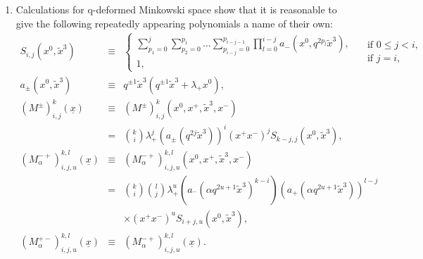 \documentclass[a4paper,11pt,oneside]{article}
\newcommand{\text}[1]{\mbox{#1}}
\begin{document}
\begin{enumerate}
\item  Calculations for q-deformed Minkowski space show that it is
reasonable to give the following repeatedly appearing polynomials a name of
their own: 
\begin{eqnarray}
S_{i,j}\left( x^{0},\tilde{x}^{3}\right) &\equiv &\left\{ 
\begin{array}{c}
\sum\limits_{p_{1}=0}^{j}\sum\limits_{p_{2}=0}^{p_{1}}\ldots
\sum\limits_{p_{i-j}=0}^{p_{i-j-1}}\prod\limits_{l=0}^{i-j}a_{-}\left(
x^{0},q^{2p_{l}}\tilde{x}^{3}\right) ,\quad \\ 
1,\quad
\end{array}
\right. \left. 
\begin{array}{l}
\text{if }0\leq j<i, \\ 
\text{if }j=i,
\end{array}
\right.  \nonumber \\
a_{\pm }\left( x^{0},\tilde{x}^{3}\right) &\equiv &q^{\pm 1}\tilde{x}%
^{3}\left( q^{\pm 1}\tilde{x}^{3}+\lambda _{+}x^{0}\right) , \\
\left( M^{\pm }\right) _{i,j}^{k}\left( \underline{x}\right) &\equiv &\left(
M^{\pm }\right) _{i,j}^{k}\left( x^{0},x^{+},\tilde{x}^{3},x^{-}\right) 
\nonumber \\
&=&{k \choose i}\lambda _{+}^{j}\left( a_{\pm }\left( q^{2j}\tilde{x}%
^{3}\right) \right) ^{i}\left( x^{+}x^{-}\right) ^{j}S_{k-j,j}\left( x^{0},%
\tilde{x}^{3}\right) ,  \nonumber \\
\left( M_{\alpha }^{-+}\right) _{i,j,u}^{k,l}\left( \underline{x}\right)
&\equiv &\left( M_{\alpha }^{-+}\right) _{i,j,u}^{k,l}\left( x^{0},x^{+},%
\tilde{x}^{3},x^{-}\right)  \nonumber \\
&=&{k \choose i}{l \choose j}\lambda _{+}^{u}\left( a_{^{-}}\left( \alpha
q^{2u+1}\tilde{x}^{3}\right) ^{k-i}\right) \left( a_{+}\left( \alpha q^{2u+1}%
\tilde{x}^{3}\right) \right) ^{l-j}  \nonumber \\
&&\times \left( x^{+}x^{-}\right) ^{u}S_{i+j,u}\left( x^{0},\tilde{x}%
^{3}\right) ,  \nonumber \\
\left( M_{\alpha }^{+-}\right) _{i,j,u}^{k,l}\left( \underline{x}\right)
&\equiv &\left( M_{\alpha }^{-+}\right) _{i,j,u}^{k,l}\left( \underline{x}%
\right) .  \nonumber
\end{eqnarray}


\end{enumerate}
\end{document}
